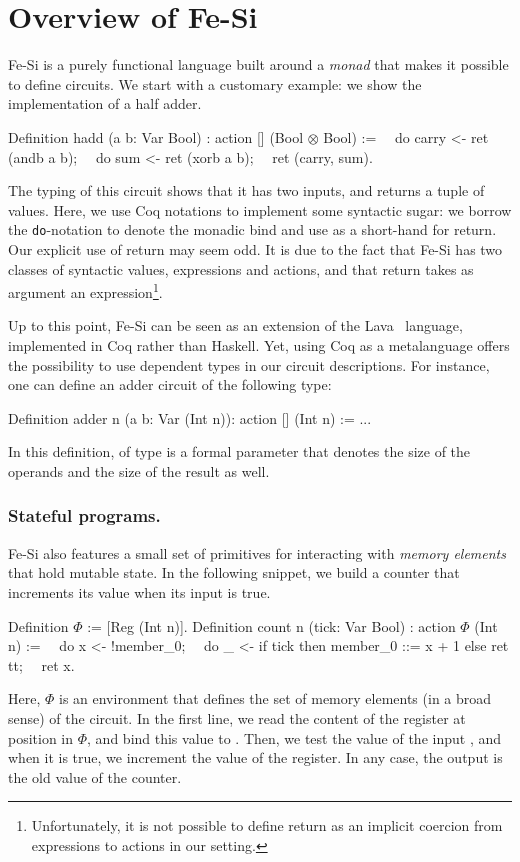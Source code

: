 \documentclass{llncs}
\begin{document}
\section{Overview of Fe-Si}
Fe-Si is a purely functional language built around a \emph{monad} that
makes it possible to define circuits. We start with a customary
example: we show the implementation of a half adder.
\begin{mcoq}
Definition hadd (a b: Var Bool) : action [] (Bool $\otimes$ Bool) :=
$\quad$do carry <- ret (andb a b); 
$\quad$do sum    <- ret (xorb a b);
$\quad$ret (carry, sum).  
\end{mcoq}
The typing of this circuit shows that it has two inputs, and
returns a tuple of values. 
%
Here, we use Coq notations to implement some syntactic sugar: we
borrow the \texttt{do}-notation to denote the monadic bind and use
 as a short-hand for return. 
% 
Our explicit use of return may seem odd. It is due to the fact that
Fe-Si has two classes of syntactic values, expressions and actions,
and that return takes as argument an
expression\footnote{Unfortunately, it is not possible to define return
  as an implicit coercion from expressions to actions in our setting.}. 

Up to this point, Fe-Si can be seen as an extension of the
Lava~\cite{Bjesse98lava:hardware} language, implemented in Coq rather
than Haskell. Yet, using Coq as a metalanguage offers the possibility
to use dependent types in our circuit descriptions. For instance, one
can define an adder circuit of the following type:
\begin{mcoq}
Definition adder n (a b: Var (Int n)): action [] (Int n) := ...
\end{mcoq}
In this definition,  of type  is a formal parameter
that denotes the size of the operands and the size of the result as
well. 

\subsubsection{Stateful programs.}
Fe-Si also features a small set of primitives for interacting with
\emph{memory elements} that hold mutable state. In the following
snippet, we build a counter that increments its value when its input
is true.
\begin{mcoq}
Definition $\Phi$ := [Reg (Int n)].
Definition count n (tick: Var Bool) : action $\Phi$ (Int n) :=
$\quad$do x <- !member_0;
$\quad$do _ <- if tick then {member_0 ::= x + 1} else {ret tt}; 
$\quad$ret x. 
\end{mcoq}
Here, $\Phi$ is an environment that defines the set of memory elements
(in a broad sense) of the circuit. In the first line, we read the
content of the register at position  in $\Phi$, and
bind this value to . Then, we test the value of the input
, and when it is true, we increment the value of the
register. In any case, the output is the old value of the counter.
\end{document}
